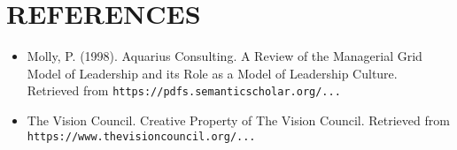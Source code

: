 \documentclass[12pt]{report}
\begin{document}
	
	\chapter*{REFERENCES}
	\begin{itemize}
		\item Molly, P. (1998). Aquarius Consulting. A Review of the Managerial Grid Model of Leadership and its Role as a Model of Leadership Culture. Retrieved from \texttt{https://pdfs.semanticscholar.org/...}
		\item The Vision Council. Creative Property of The Vision Council. Retrieved from \texttt{https://www.thevisioncouncil.org/...}
	\end{itemize}
	
\end{document}
